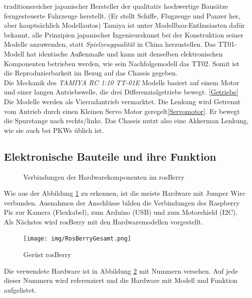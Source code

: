 \documentclass[conference]{IEEEtran}
\begin{document}
	traditionsreicher japanischer Hersteller der qualitativ hochwertige Bausätze 
	ferngesteuerte Fahrzeuge herstellt. (Er stellt Schiffe, Flugzeuge und Panzer 
	her, aber hauptsächlich Modellautos) Tamiya ist unter 
	Modellbau-Enthusiasten dafür bekannt, alle Prinzipien japanischer 
	Ingenieurskunst bei der Konstruktion seiner Modelle anzuwenden, statt 
	\textit{Spielzeugqualität} in China herzustellen. Das TT01-Modell hat 
	identische Außenmaße und kann mit denselben elektronischen Komponenten 
	betrieben werden, wie sein Nachfolgemodell das TT02. Somit ist die 
	Reproduzierbarkeit im Bezug auf das Chassis gegeben.
	\\
	Die Mechanik des \textit{TAMIYA RC 1:10 TT-01E } Modells basiert auf 
	einem Motor und einer langen Antriebswelle, die drei Differenzialgetriebe 
	bewegt. \ref{Getriebe} Die Modelle werden als Vierradantrieb vermarktet. 
	Die Lenkung wird Getrennt vom Antrieb durch einen Kleinen Servo Motor 
	geregelt\ref{Servomotor}. Er bewegt die Spurstange nach rechts/links. Das 
	Chassis nutzt also eine Akkerman Lenkung, wie sie auch bei PKWs üblich ist.
	
	\subsection{Elektronische Bauteile und ihre Funktion}
	\begin{figure} %
		\centering
		\def\svgwidth{9cm}
		
		\caption{Verbindungen der Hardwarekomponenten im rosBerry}
		\label{Hardwarekomponenten}
	\end{figure}
	
	Wie aus der Abbildung \ref{Hardwarekomponenten} zu erkennen, ist die meiste Hardware mit Jumper Wire verbunden.
	Ausnahmen der Anschlüsse bilden die Verbindungen des Raspberry Pis zur Kamera (Flexkabel), zum Arduino (USB) und zum Motorshield (I2C).
	\\
	
	Als Nächstes wird rosBerry mit den Hardwaremodellen vorgestellt.
	\\
	\begin{figure}[!ht]
		\centering
		\texttt{[image: img/RosBerryGesamt.png]}
		\caption{Gerüst rosBerry}
		\label{rosBerryGesamt}
	\end{figure}
	
	Die verwendete Hardware ist in Abbildung \ref{rosBerryGesamt} mit Nummern versehen.
	Auf jede dieser Nummern wird referenziert und die Hardware mit Modell und Funktion aufgelistet.
	
\end{document}
